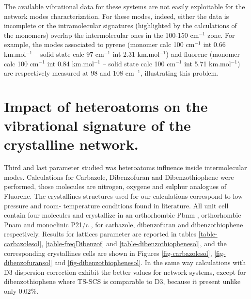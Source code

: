The available vibrational data for these  systems are not easily exploitable for the network modes characterization. For these modes, indeed, either the data is incomplete or the intramolecular signatures (highlighted by the calculations of the monomers) overlap the intermolecular ones in the 100-150 cm$^{-1}$ zone.  For example, the modes associated to pyrene (monomer calc 100 cm$^{-1}$ int 0.66 km.mol$^{-1}$ – solid state calc 97 cm$^{-1}$ int 2.31 km.mol$^{-1}$) and fluorene (monomer calc 100 cm$^{-1}$ int 0.84 km.mol$^{-1}$ – solid state calc 100 cm$^{-1}$ int 5.71 km.mol$^{-1}$) are respectively measured at 98 and 108 cm$^{-1}$, illustrating this problem.


\section{Impact of heteroatoms on the vibrational signature of the crystalline network.}


			
 	Third and last parameter studied was heteroatoms influence inside intermolecular modes. Calculations for Carbazole, Dibenzofuran and Dibenzothiophene were performed, those molecules are nitrogen, oxygene and sulphur analogues of Fluorene. The crystallines structures used for our calculations correspond to low- pressure and room- temperature conditions found in literature. All unit cell contain four molecules and crystallize in an orthorhombic Pbnm \cite{belskii1985structure}, orthorhombic Pnam \cite{dideberg1972crystal} and monoclinic P21/c \cite{schaffrin1970structure}, for carbazole, dibenzofuran and dibenzothiophene respectively. Results for lattices parameter are reported in tables \ref{table-carbazolesol}, \ref{table-freqDibenzof} and \ref{table-dibenzothiophenesol}, and the corresponding crystallines cells are shown in Figures \ref{fig-carbazolesol}, \ref{fig-dibenzofuransol} and \ref{fig-dibenzothiophenesol}. In the same way calculations with D3 dispersion correction exhibit the better values for network systems, except for dibenzothiophene where TS-SCS is comparable to D3, because it present unlike only 0.02\%.
 	

